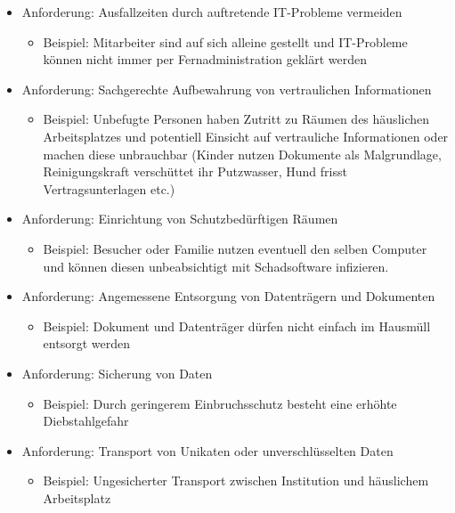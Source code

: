 \documentclass[a4paper, 12pt]{report}
\begin{document}
\begin{multicols}{2}
\begin{itemize}
	\item Anforderung: Ausfallzeiten durch auftretende IT-Probleme 
		vermeiden
		\begin{itemize}
			\item Beispiel: Mitarbeiter sind auf sich alleine 
				gestellt und IT-Probleme können nicht immer per 
				Fernadministration geklärt werden
		\end{itemize}
	\item Anforderung: Sachgerechte Aufbewahrung von vertraulichen 
		Informationen
		\begin{itemize}
			\item Beispiel: Unbefugte Personen haben Zutritt zu 
				Räumen des häuslichen Arbeitsplatzes und 
				potentiell Einsicht auf vertrauliche 
				Informationen oder machen diese unbrauchbar 
				(Kinder nutzen Dokumente als Malgrundlage, 
				Reinigungskraft verschüttet ihr Putzwasser, Hund
				frisst Vertragsunterlagen etc.)
		\end{itemize}
	\item Anforderung: Einrichtung von Schutzbedürftigen Räumen
		\begin{itemize}
			\item Beispiel: Besucher oder Familie nutzen eventuell
				den selben Computer und können diesen 
				unbeabsichtigt mit Schadsoftware infizieren. 
		\end{itemize}
	\item Anforderung: Angemessene Entsorgung von Datenträgern und 
		Dokumenten
		\begin{itemize}
			\item Beispiel: Dokument und Datenträger dürfen nicht 
				einfach im Hausmüll entsorgt werden
		\end{itemize}
	\item Anforderung: Sicherung von Daten
		\begin{itemize}
			\item Beispiel: Durch geringerem Einbruchsschutz 
				besteht eine erhöhte Diebstahlgefahr
		\end{itemize}
	\item Anforderung: Transport von Unikaten oder unverschlüsselten Daten
		\begin{itemize}
			\item Beispiel: Ungesicherter Transport zwischen 
				Institution und häuslichem Arbeitsplatz
		\end{itemize}
\end{itemize}


\end{multicols}
\end{document}
